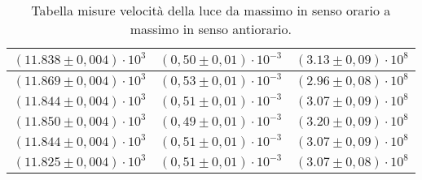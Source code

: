 \begin{table}[H]
\begin{tabular}{|c|c|c|}
        \hline
        $ (11.838 \pm 0,004) \cdot 10^{3} $ & $ (0,50 \pm 0,01) \cdot 10^{-3} $ & $ (3.13 \pm 0,09) \cdot 10^{8} $\\
        \hline
        $ (11.869 \pm 0,004) \cdot 10^{3} $ & $ (0,53 \pm 0,01) \cdot 10^{-3} $ & $ (2.96 \pm 0,08) \cdot 10^{8} $\\
        \hline
        $ (11.844 \pm 0,004) \cdot 10^{3} $ & $ (0,51 \pm 0,01) \cdot 10^{-3} $ & $ (3.07 \pm 0,09) \cdot 10^{8} $\\
        \hline
        $ (11.850 \pm 0,004) \cdot 10^{3} $ & $ (0,49 \pm 0,01) \cdot 10^{-3} $ & $ (3.20 \pm 0,09) \cdot 10^{8} $\\
        \hline
        $ (11.844 \pm 0,004) \cdot 10^{3} $ & $ (0,51 \pm 0,01) \cdot 10^{-3} $ & $ (3.07 \pm 0,09) \cdot 10^{8} $\\
        \hline
        $ (11.825 \pm 0,004) \cdot 10^{3} $ & $ (0,51 \pm 0,01) \cdot 10^{-3} $ & $ (3.07 \pm 0,08) \cdot 10^{8} $\\
        \hline
        \end{tabular}
    \caption{Tabella misure velocità della luce da massimo in senso orario a massimo in senso antiorario.}
\end{table}